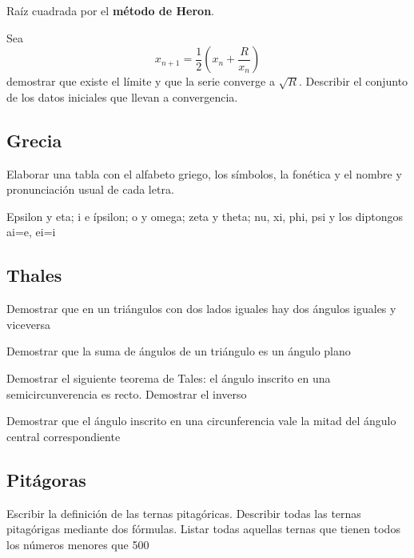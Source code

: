 \begin{problem}[4]
Raíz cuadrada por el \textbf{método de Heron}.

Sea
\[x_{n+1} = \frac{1}{2} \left(x_n + \frac{R}{x_n} \right)\]
demostrar que existe el límite y que la serie converge a  $\sqrt{R}$. Describir el conjunto de los datos iniciales que llevan a convergencia.
\solution

\end{problem}

\subsection{Grecia}
\begin{problem}[5]
Elaborar una tabla con el alfabeto griego, los símbolos, la fonética y el nombre y pronunciación usual de cada letra.

\obs Epsilon y eta; i e ípsilon; o y omega; zeta y theta; nu, xi, phi, psi y los diptongos ai=e, ei=i

\solution

\end{problem}

\subsection{Thales}
\begin{problem}[6]
\ppart Demostrar que en un triángulos con dos lados iguales hay dos ángulos iguales y viceversa

\ppart Demostrar que la suma de ángulos de un triángulo es un ángulo plano

\ppart Demostrar el siguiente teorema de Tales: el ángulo inscrito en una semicircunverencia es recto. Demostrar el inverso

\ppart Demostrar que el ángulo inscrito en una circunferencia vale la mitad del ángulo central correspondiente

\solution

\end{problem}

\subsection{Pitágoras}
\begin{problem}[7]
Escribir la definición de las ternas pitagóricas. Describir todas las ternas pitagórigas mediante dos fórmulas. Listar todas aquellas ternas que tienen todos los números menores que 500

\solution

\end{problem}

